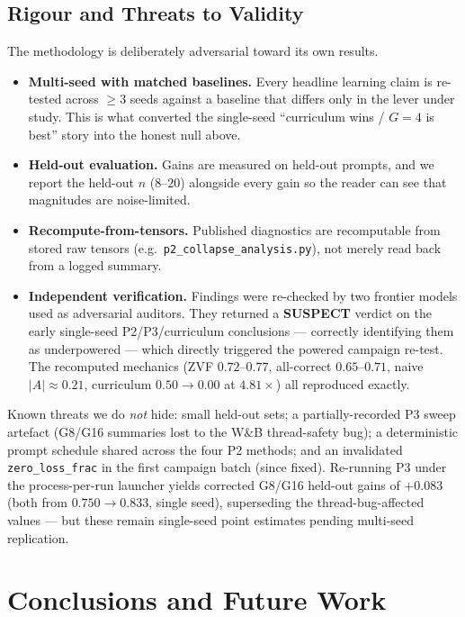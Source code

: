 \documentclass[12pt,a4paper]{report}
\begin{document}
\section{Rigour and Threats to Validity}
\label{sec:rigor}
The methodology is deliberately adversarial toward its own results.
\begin{itemize}[leftmargin=1.4em,itemsep=2pt]
  \item \textbf{Multi-seed with matched baselines.} Every headline learning claim is
  re-tested across $\ge 3$ seeds against a baseline that differs only in the lever
  under study. This is what converted the single-seed ``curriculum wins / $G{=}4$ is
  best'' story into the honest null above.
  \item \textbf{Held-out evaluation.} Gains are measured on held-out prompts, and we
  report the held-out $n$ ($8$--$20$) alongside every gain so the reader can see that
  magnitudes are noise-limited.
  \item \textbf{Recompute-from-tensors.} Published diagnostics are recomputable from
  stored raw tensors (e.g.\ \texttt{p2\_collapse\_analysis.py}), not merely read back
  from a logged summary.
  \item \textbf{Independent verification.} Findings were re-checked by two frontier
  models used as adversarial auditors. They returned a \textbf{SUSPECT} verdict on
  the early single-seed P2/P3/curriculum conclusions --- correctly identifying them as
  underpowered --- which directly triggered the powered campaign re-test. The
  recomputed mechanics (ZVF $0.72$--$0.77$, all-correct $0.65$--$0.71$, naive
  $|A|\approx0.21$, curriculum $0.50\to0.00$ at $4.81\times$) all reproduced exactly.
\end{itemize}
Known threats we do \emph{not} hide: small held-out sets; a partially-recorded P3
sweep artefact (G8/G16 summaries lost to the W\&B thread-safety bug); a deterministic
prompt schedule shared across the four P2 methods; and an invalidated
\texttt{zero\_loss\_frac} in the first campaign batch (since fixed). Re-running P3
under the process-per-run launcher yields corrected G8/G16 held-out gains of
$+0.083$ (both from $0.750\to0.833$, single seed), superseding the thread-bug-affected
values --- but these remain single-seed point estimates pending multi-seed
replication.

\chapter{Conclusions and Future Work}
\label{ch:conclusion}
\end{document}
